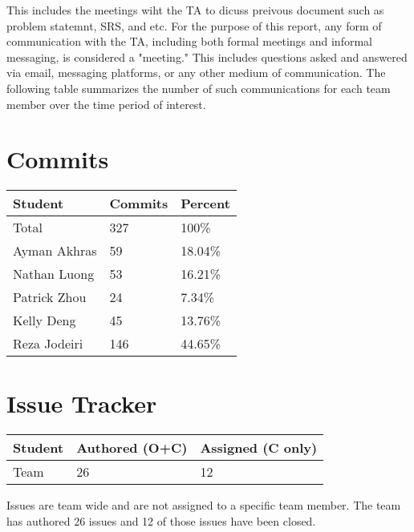 \documentclass{article}
\begin{document}
This includes the meetings wiht the TA to dicuss preivous document such as problem statemnt, SRS, and etc.
For the purpose of this report, any form of communication with the TA, including both formal meetings and informal messaging, is considered a "meeting." This includes questions asked and answered via email, messaging platforms, or any other medium of communication. The following table summarizes the number of such communications for each team member over the time period of interest.

\section{Commits}


\begin{table}[H]
\centering
\begin{tabular}{lll}
\toprule
\textbf{Student} & \textbf{Commits} & \textbf{Percent}\\
\midrule
Total & 327 & 100\% \\
Ayman Akhras & 59 & 18.04\%\\
Nathan Luong & 53 & 16.21\%\\
Patrick Zhou & 24 & 7.34\%\\
Kelly Deng & 45 & 13.76\%\\
Reza Jodeiri & 146 & 44.65\%\\
\bottomrule
\end{tabular}
\end{table}



\section{Issue Tracker}


\begin{table}[H]
\centering
\begin{tabular}{lll}
\toprule
\textbf{Student} & \textbf{Authored (O+C)} & \textbf{Assigned (C only)}\\
\midrule
Team & 26 & 12 \\
\bottomrule
\end{tabular}
\end{table}

Issues are team wide and are not assigned to a specific team member. The team has authored 26 issues and 12 of those issues have been closed.
\end{document}
